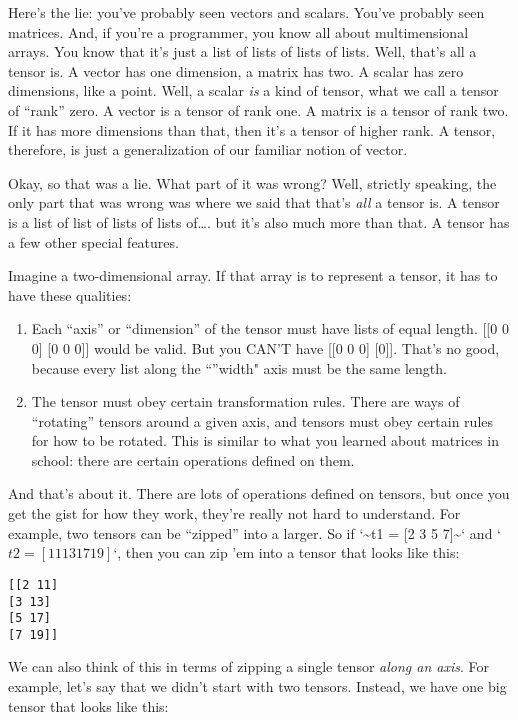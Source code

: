 \documentclass[11pt]{article}
\begin{document}
Here's the lie: you've probably seen vectors and scalars. You've probably seen matrices. And, if you're a programmer, you know all about multimensional arrays. You know that it's just a list of lists of lists of lists. Well, that's all a tensor is. A vector has one dimension, a matrix has two. A scalar has zero dimensions, like a point. Well, a scalar \emph{is} a kind of tensor, what we call a tensor of ``rank'' zero. A vector is a tensor of rank one. A matrix is a tensor of rank two. If it has more dimensions than that, then it's a tensor of higher rank. A tensor, therefore, is just a generalization of our familiar notion of vector.

Okay, so that was a lie. What part of it was wrong? Well, strictly speaking, the only part that was wrong was where we said that that's \emph{all} a tensor is. A tensor is a list of list of lists of lists of\ldots{}. but it's also much more than that. A tensor has a few other special features.

Imagine a two-dimensional array. If that array is to represent a tensor, it has to have these qualities:

\begin{enumerate}
\item Each ``axis'' or ``dimension'' of the tensor must have lists of equal length. [[0 0 0] [0 0 0]] would be valid. But you CAN'T have [[0 0 0] [0]]. That's no good, because every list along the ``''width" axis must be the same length.
\item The tensor must obey certain transformation rules. There are ways of ``rotating'' tensors around a given axis, and tensors must obey certain rules for how to be rotated. This is similar to what you learned about matrices in school: there are certain operations defined on them.
\end{enumerate}

And that's about it. There are lots of operations defined on tensors, but once you get the gist for how they work, they're really not hard to understand. For example, two tensors can be ``zipped'' into a larger. So if `\textasciitilde{}t1 = [2 3 5 7]\textasciitilde{}` and `\(t2 = [11 13 17 19]\)`, then you can zip 'em into a tensor that looks like this:
\begin{verbatim}
[[2 11]
[3 13]
[5 17]
[7 19]]
\end{verbatim}

We can also think of this in terms of zipping a single tensor \emph{along an axis}. For example, let's say that we didn't start with two tensors. Instead, we have one big tensor that looks like this:
\end{document}
